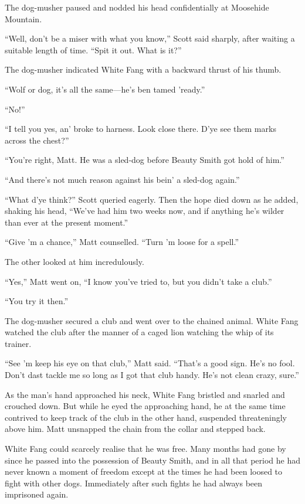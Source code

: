 \documentclass[10pt]{book}
\begin{document}
The dog-musher paused and nodded his head confidentially at Moosehide
Mountain.

“Well, don’t be a miser with what you know,” Scott said sharply, after
waiting a suitable length of time. “Spit it out. What is it?”

The dog-musher indicated White Fang with a backward thrust of his
thumb.

“Wolf or dog, it’s all the same—he’s ben tamed ’ready.”

“No!”

“I tell you yes, an’ broke to harness. Look close there. D’ye see them
marks across the chest?”

“You’re right, Matt. He was a sled-dog before Beauty Smith got hold of
him.”

“And there’s not much reason against his bein’ a sled-dog again.”

“What d’ye think?” Scott queried eagerly. Then the hope died down as he
added, shaking his head, “We’ve had him two weeks now, and if anything
he’s wilder than ever at the present moment.”

“Give ’m a chance,” Matt counselled. “Turn ’m loose for a spell.”

The other looked at him incredulously.

“Yes,” Matt went on, “I know you’ve tried to, but you didn’t take a
club.”

“You try it then.”

The dog-musher secured a club and went over to the chained animal.
White Fang watched the club after the manner of a caged lion watching
the whip of its trainer.

“See ’m keep his eye on that club,” Matt said. “That’s a good sign.
He’s no fool. Don’t dast tackle me so long as I got that club handy.
He’s not clean crazy, sure.”

As the man’s hand approached his neck, White Fang bristled and snarled
and crouched down. But while he eyed the approaching hand, he at the
same time contrived to keep track of the club in the other hand,
suspended threateningly above him. Matt unsnapped the chain from the
collar and stepped back.

White Fang could scarcely realise that he was free. Many months had
gone by since he passed into the possession of Beauty Smith, and in all
that period he had never known a moment of freedom except at the times
he had been loosed to fight with other dogs. Immediately after such
fights he had always been imprisoned again.
\end{document}

